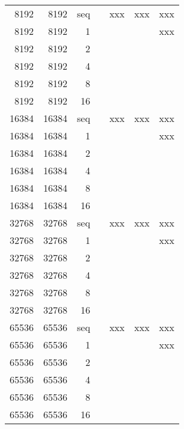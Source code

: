 \begin{center}
\begin{tabular}{ | r | r | r | r | r | r | r |}
	8192    &	8192    &	seq	&				&	xxx		&	xxx	&	xxx \\
    8192   	&	8192   	&	1	&	 	 		&			&		&	xxx \\
    8192   	&	8192   	&	2	&	 	 	 	&			&		&\\
    8192   	&	8192   	&	4	&	 	 	 	&			&		&\\
    8192   	&	8192   	&	8	&	 	 	 	&			&		&\\
    8192   	&	8192   	&	16	&	 	 	 	&			&		&\\
                        
	16384   &	16384   &	seq	&				&	xxx		&	xxx	&	xxx \\
    16384  	&	16384  	&	1	&	 	 		&			&		&	xxx \\
    16384  	&	16384  	&	2	&	 	 	 	&			&		&\\
    16384  	&	16384  	&	4	&	 	 	 	&			&		&\\
    16384  	&	16384  	&	8	&	 	 	 	&			&		&\\
    16384  	&	16384  	&	16	&	 	 	 	&			&		&\\
	            
	32768   &	32768   &	seq	&				&	xxx		&	xxx	&	xxx \\
    32768  	&	32768  	&	1	&	 	 		&			&		&	xxx \\
    32768  	&	32768  	&	2	&	 	 	 	&			&		&\\
    32768  	&	32768  	&	4	&	 	 	 	&			&		&\\
    32768  	&	32768  	&	8	&	 	 	 	&			&		&\\
    32768  	&	32768  	&	16	&	 	 	 	&			&		&\\
	            
	65536   &	65536   &	seq	&				&	xxx		&	xxx	&	xxx \\
    65536  	&	65536  	&	1	&	 	 		&			&		&	xxx \\
    65536  	&	65536  	&	2	&	 	 	 	&			&		&\\
    65536  	&	65536  	&	4	&	 	 	 	&			&		&\\
    65536  	&	65536  	&	8	&	 	 	 	&			&		&\\
    65536  	&	65536  	&	16	&	 	 	 	&			&		&\\
	\hline
	\end{tabular}
\end{center}

\restoregeometry
	
